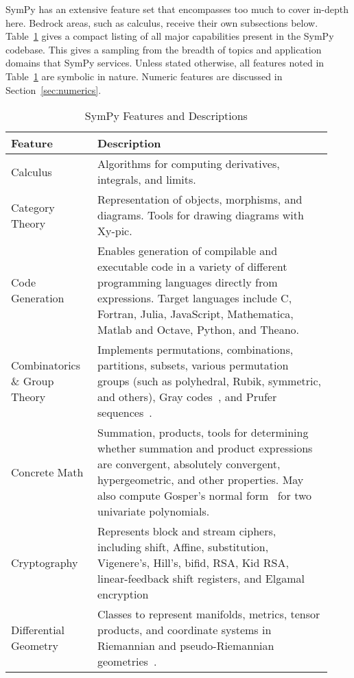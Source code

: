 
SymPy has an extensive feature set that encompasses too much to cover in-depth
here. Bedrock areas, such as calculus, receive their own subsections below.
Table~\ref{features-table} gives a compact listing of all major capabilities
present in the SymPy codebase. This gives a sampling from the breadth of
topics and application domains that SymPy services. Unless stated otherwise,
all features noted in Table~\ref{features-table} are symbolic in nature.
Numeric features are discussed in Section~\ref{sec:numerics}.


\begin{longtable}[htbc]{p{0.25\linewidth}p{0.68\linewidth}}
\caption{SymPy Features and Descriptions\label{features-table}}\\
\toprule
\textbf{Feature} & \textbf{Description} \\
\midrule
Calculus & Algorithms for computing derivatives, integrals, and limits.\\

Category Theory & Representation of objects, morphisms, and diagrams. Tools
for drawing diagrams with Xy-pic.\\

Code Generation & Enables generation of compilable and executable code in a
variety of different programming languages directly from expressions. Target
languages include C, Fortran, Julia, JavaScript,
Mathematica, Matlab and Octave, Python, and Theano.\\

Combinatorics \& Group Theory & Implements permutations, combinations,
partitions, subsets, various permutation groups (such as polyhedral, Rubik,
symmetric, and others), Gray codes~\cite{Nijenhuis1978combinatorial},
and Prufer sequences~\cite{biggs1976graph}.\\

Concrete Math & Summation, products, tools for determining whether summation
and product expressions are convergent, absolutely convergent, hypergeometric,
and
other properties. May also compute Gosper's normal form~\cite{petkovvsek1996bak} for two univariate polynomials.\\

Cryptography & Represents block and stream ciphers, including shift, Affine,
substitution, Vigenere's, Hill's, bifid, RSA, Kid RSA,
linear-feedback shift registers, and Elgamal encryption\\

Differential Geometry & Classes to represent manifolds, metrics, tensor
products, and coordinate systems in Riemannian and pseudo-Riemannian
geometries~\cite{FunctionalDifferentialGeometry}.\\


\end{longtable}
